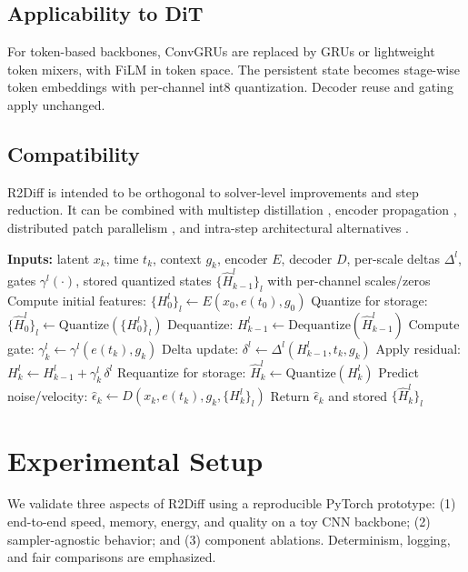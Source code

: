 \documentclass{article}
\begin{document}
\subsection{Applicability to DiT}
For token-based backbones, ConvGRUs are replaced by GRUs or lightweight token mixers, with FiLM in token space. The persistent state becomes stage-wise token embeddings with per-channel int8 quantization. Decoder reuse and gating apply unchanged.

\subsection{Compatibility}
R2Diff is intended to be orthogonal to solver-level improvements and step reduction. It can be combined with multistep distillation \cite{salimans-2024-multistep}, encoder propagation \cite{li-2023-faster}, distributed patch parallelism \cite{li-2024-distrifusion}, and intra-step architectural alternatives \cite{yan-2023-diffusion,phung-2022-wavelet}.

\begin{algorithm}[H]
\caption{R2Diff backbone update within a sampler step}
\begin{algorithmic}
  \State \textbf{Inputs:} latent $x_k$, time $t_k$, context $g_k$, encoder $E$, decoder $D$, per-scale deltas $\Delta^l$, gates $\gamma^l(\cdot)$, stored quantized states $\{\hat{H}_{k-1}^l\}_l$ with per-channel scales/zeros
    \State Compute initial features: $\{H_0^l\}_l \leftarrow E(x_0, e(t_0), g_0)$
    \State Quantize for storage: $\{\hat{H}_0^l\}_l \leftarrow \text{Quantize}(\{H_0^l\}_l)$
  \Else
      \State Dequantize: $H_{k-1}^l \leftarrow \text{Dequantize}(\hat{H}_{k-1}^l)$
      \State Compute gate: $\gamma_k^l \leftarrow \gamma^l(e(t_k), g_k)$
      \State Delta update: $\delta^l \leftarrow \Delta^l(H_{k-1}^l, t_k, g_k)$
      \State Apply residual: $H_k^l \leftarrow H_{k-1}^l + \gamma_k^l\, \delta^l$
      \State Requantize for storage: $\hat{H}_k^l \leftarrow \text{Quantize}(H_k^l)$
    \EndFor
  \EndIf
  \State Predict noise/velocity: $\hat{\epsilon}_k \leftarrow D(x_k, e(t_k), g_k, \{H_k^l\}_l)$
  \State Return $\hat{\epsilon}_k$ and stored $\{\hat{H}_k^l\}_l$
\end{algorithmic}
\end{algorithm}

\section{Experimental Setup}
We validate three aspects of R2Diff using a reproducible PyTorch prototype: (1) end-to-end speed, memory, energy, and quality on a toy CNN backbone; (2) sampler-agnostic behavior; and (3) component ablations. Determinism, logging, and fair comparisons are emphasized.
\end{document}
